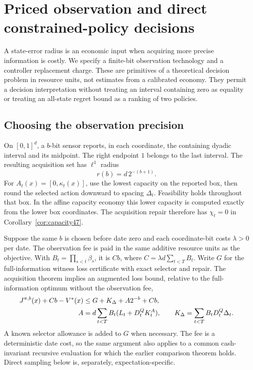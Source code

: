 \section{Priced observation and direct constrained-policy decisions}\label{sec:economic48}
A state-error radius is an economic input when acquiring more precise information is costly. We specify a finite-bit observation technology and a controller replacement charge. These are primitives of a theoretical decision problem in resource units, not estimates from a calibrated economy. They permit a decision interpretation without treating an interval containing zero as equality or treating an all-state regret bound as a ranking of two policies.

\subsection{Choosing the observation precision}
On $[0,1]^d$, a $b$-bit sensor reports, in each coordinate, the containing dyadic interval and its midpoint. The right endpoint $1$ belongs to the last interval. The resulting acquisition set has $\ell^1$ radius
\begin{equation}\label{eq:sensor-radius48}
 r(b)=d\,2^{-(b+1)}.
\end{equation}
For $A_t(x)=[0,\kappa_t(x)]$, use the lowest capacity on the reported box, then round the selected action downward to spacing $\Delta_t$. Feasibility holds throughout that box. In the affine capacity economy this lower capacity is computed exactly from the lower box coordinates. The acquisition repair therefore has $\chi_t=0$ in Corollary~\ref{cor:capacity47}.

Suppose the same $b$ is chosen before date zero and each coordinate-bit costs $\lambda>0$ per date. The observation fee is paid in the same additive resource units as the objective. With $B_t=\prod_{s<t}\beta_s$, it is $C b$, where $C=\lambda d\sum_{t<T}B_t$. Write $G$ for the full-information witness loss certificate with exact selector and repair. The acquisition theorem implies an augmented loss bound, relative to the full-information optimum without the observation fee,
\begin{align}\label{eq:priced48}
 J^{\pi,b}(x)+Cb-V^*(x)
 &\le G+K_\Delta+A2^{-b}+Cb,\\
 A&=d\sum_{t<T}B_t(L_t+D_t^QK_t^A),\qquad
 K_\Delta=\sum_{t<T}B_tD_t^Q\Delta_t.\notag
\end{align}
A known selector allowance is added to $G$ when necessary. The fee is a deterministic date cost, so the same argument also applies to a common cash-invariant recursive evaluation for which the earlier comparison theorem holds. Direct sampling below is, separately, expectation-specific.

